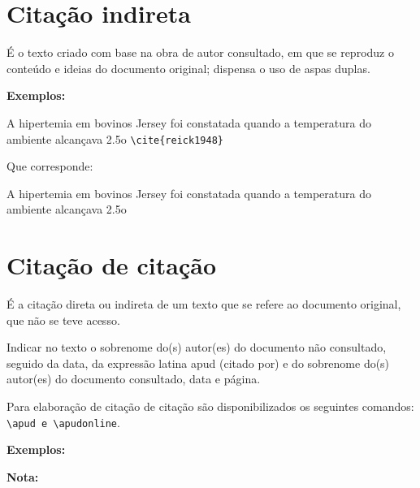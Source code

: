 \section{Citação indireta}

É o texto criado com base na obra de autor consultado, em que se reproduz o conteúdo e ideias do documento original; dispensa o uso de aspas duplas.

\textbf{Exemplos:}

A hipertemia em bovinos Jersey foi constatada quando a temperatura do ambiente
alcançava 2.5o \verb+\cite{reick1948}+

Que corresponde:

A hipertemia em bovinos Jersey foi constatada quando a temperatura do ambiente
alcançava 2.5o \cite{reick1948}


\section{Citação de citação}

É a citação direta ou indireta de um texto que se refere ao documento original, que não se teve acesso.

Indicar no texto o sobrenome do(s) autor(es) do documento não consultado, seguido da data, da expressão latina apud (citado por) e do sobrenome do(s) autor(es) do documento consultado, data e p\'agina. 

Para elaboração de citação de citação são disponibilizados os seguintes comandos: \verb+\apud e \apudonline+.

\textbf{Exemplos:}

\textbf{Nota:}

